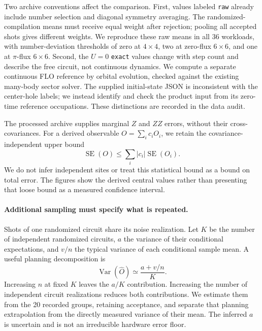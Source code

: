 \documentclass[11pt]{article}
\begin{document}
Two archive conventions affect the comparison. First, values labeled
\texttt{raw} already include number selection and diagonal symmetry averaging.
The randomized-compilation means must receive equal weight after rejection;
pooling all accepted shots gives different weights. We reproduce these raw
means in all 36 workloads, with number-deviation thresholds of zero at
$4\times4$, two at zero-flux $6\times6$, and one at $\pi$-flux $6\times6$.
Second, the $U=0$
\texttt{exact} values change with step count and describe the free circuit,
not continuous dynamics. We compute a separate continuous FLO reference by
orbital evolution, checked against the existing many-body sector solver.
The supplied initial-state JSON is inconsistent with the center-hole labels;
we instead identify and check the product input from its zero-time reference
occupations. These distinctions are recorded in the data audit.

The processed archive supplies marginal $Z$ and $ZZ$ errors, without their
cross-covariances. For a derived observable $O=\sum_i c_i O_i$, we retain
the covariance-independent upper bound
\begin{equation}\label{eq:willow-derived-se}
 \operatorname{SE}(O)\leq\sum_i |c_i|\operatorname{SE}(O_i).
\end{equation}
We do not infer independent sites or treat this statistical bound as a bound
on total error. The figures show the derived central values rather than
presenting that loose bound as a measured confidence interval.

\paragraph{Additional sampling must specify what is repeated.}
Shots of one randomized circuit share its noise realization. Let $K$ be the
number of independent randomized circuits, $a$ the variance of their
conditional expectations, and $v/n$ the typical variance of each conditional
sample mean. A useful planning decomposition is
\begin{equation}\label{eq:willow-sampling}
 \operatorname{Var}(\widehat O)\simeq\frac{a+v/n}{K}.
\end{equation}
Increasing $n$ at fixed $K$ leaves the $a/K$ contribution. Increasing the
number of independent circuit realizations reduces both contributions.
We estimate them from the 20 recorded groups, retaining acceptance, and
separate that planning extrapolation from the directly measured variance of
their mean. The inferred $a$ is uncertain and is not an irreducible hardware
error floor.
\end{document}
